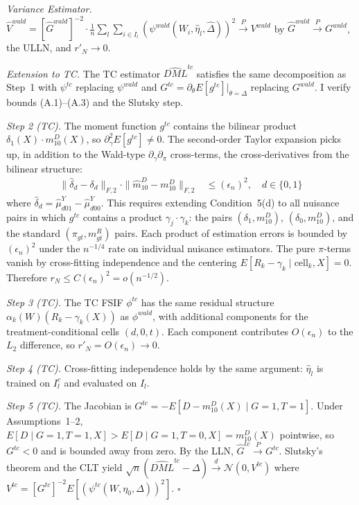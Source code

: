 \begin{theoremproof}
    \textit{Variance Estimator.} $\hat{V}^{wald} = [\hat{G}^{wald}]^{-2} \cdot \frac{1}{n}\sum_{l}\sum_{i \in I_l} (\psi^{wald}(W_i, \hat{\eta}_l, \hat{\Delta}))^2 \xrightarrow{P} V^{wald}$ by $\hat{G}^{wald} \xrightarrow{P} G^{wald}$, the ULLN, and $r'_N \to 0$.

    \textit{Extension to TC.} The TC estimator $\widehat{DML}^{tc}$ satisfies the same decomposition as Step~1 with $\psi^{tc}$ replacing $\psi^{wald}$ and $G^{tc} = \partial_\theta E[g^{tc}]\big|_{\theta=\Delta}$ replacing $G^{wald}$. I verify bounds (A.1)--(A.3) and the Slutsky step.

    \textit{Step 2 (TC).} The moment function $g^{tc}$ contains the bilinear product $\delta_1(X) \cdot m^D_{10}(X)$, so $\partial^2_\gamma E[g^{tc}] \neq 0$. The second-order Taylor expansion picks up, in addition to the Wald-type $\partial_\gamma \partial_\pi$ cross-terms, the cross-derivatives from the bilinear structure:
    \begin{align*}
        \|\hat{\delta}_d - \delta_d\|_{F,2} \cdot \|\hat{m}^D_{10} - m^D_{10}\|_{F,2} &\leq (\epsilon_n)^2, \quad d \in \{0,1\}
    \end{align*}
    where $\hat{\delta}_d = \hat{\mu}^Y_{d01} - \hat{\mu}^Y_{d00}$. This requires extending Condition~5(d) to all nuisance pairs in which $g^{tc}$ contains a product $\gamma_j \cdot \gamma_k$: the pairs $(\delta_1, m^D_{10})$, $(\delta_0, m^D_{10})$, and the standard $(\pi_{gt}, m^R_{gt})$ pairs. Each product of estimation errors is bounded by $(\epsilon_n)^2$ under the $n^{-1/4}$ rate on individual nuisance estimators. The pure $\pi$-terms vanish by cross-fitting independence and the centering $E[R_k - \gamma_k \mid \text{cell}_k, X] = 0$. Therefore $r_N \leq C(\epsilon_n)^2 = o(n^{-1/2})$.

    \textit{Step 3 (TC).} The TC FSIF $\phi^{tc}$ has the same residual structure $\alpha_k(W)(R_k - \gamma_k(X))$ as $\phi^{wald}$, with additional components for the treatment-conditional cells $(d,0,t)$. Each component contributes $O(\epsilon_n)$ to the $L_2$ difference, so $r'_N = O(\epsilon_n) \to 0$.

    \textit{Step 4 (TC).} Cross-fitting independence holds by the same argument: $\hat{\eta}_l$ is trained on $I_l^c$ and evaluated on $I_l$.

    \textit{Step 5 (TC).} The Jacobian is $G^{tc} = -E[D - m^D_{10}(X) \mid G\!=\!1, T\!=\!1]$. Under Assumptions~1--2, $E[D \mid G\!=\!1, T\!=\!1, X] > E[D \mid G\!=\!1, T\!=\!0, X] = m^D_{10}(X)$ pointwise, so $G^{tc} < 0$ and is bounded away from zero. By the LLN, $\hat{G}^{tc} \xrightarrow{P} G^{tc}$. Slutsky's theorem and the CLT yield $\sqrt{n}(\widehat{DML}^{tc} - \Delta) \xrightarrow{d} \mathcal{N}(0, V^{tc})$ where $V^{tc} = [G^{tc}]^{-2} E[(\psi^{tc}(W, \eta_0, \Delta))^2]$. $\square$
\end{theoremproof}

